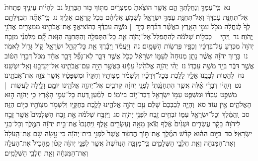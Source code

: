 \documentclass[18pt]{article}
\begin{document}
 {\loc נא~}כִּֽי־עַמְּךָ֥ וְנַחֲלָתְךָ֖ הֵ֑ם אֲשֶׁ֤ר הוֹצֵ֙אתָ֙ מִמִּצְרַ֔יִם מִתּ֖וֹךְ כּ֥וּר הַבַּרְזֶֽל׃ \startlock
 {\loc נב~}לִהְי֨וֹת עֵינֶ֤יךָ פְתֻחֹת֙ אֶל־תְּחִנַּ֣ת עַבְדְּךָ֔ וְאֶל־תְּחִנַּ֖ת עַמְּךָ֣ יִשְׂרָאֵ֑ל לִשְׁמֹ֣עַ אֲלֵיהֶ֔ם בְּכֹ֖ל קׇרְאָ֥ם אֵלֶֽיךָ׃ \startlock
 {\loc נג~}כִּֽי־אַתָּ֞ה הִבְדַּלְתָּ֤ם לְךָ֙ לְֽנַחֲלָ֔ה מִכֹּ֖ל עַמֵּ֣י הָאָ֑רֶץ כַּאֲשֶׁ֨ר דִּבַּ֜רְתָּ בְּיַ֣ד  |  מֹשֶׁ֣ה עַבְדֶּ֗ךָ בְּהוֹצִיאֲךָ֧ אֶת־אֲבֹתֵ֛ינוּ מִמִּצְרַ֖יִם אֲדֹנָ֥י יֱהֹוִֽה׃ \startlock
 {\loc נד~}וַיְהִ֣י  |  כְּכַלּ֣וֹת שְׁלֹמֹ֗ה לְהִתְפַּלֵּל֙ אֶל־יְהֹוָ֔ה אֵ֛ת כׇּל־הַתְּפִלָּ֥ה וְהַתְּחִנָּ֖ה הַזֹּ֑את קָ֞ם מִלִּפְנֵ֨י מִזְבַּ֤ח יְהֹוָה֙ מִכְּרֹ֣עַ עַל־בִּרְכָּ֔יו וְכַפָּ֖יו פְּרֻשׂ֥וֹת הַשָּׁמָֽיִם׃ \startlock
 {\loc נה~}וַיַּעֲמֹ֕ד וַיְבָ֕רֶךְ אֵ֖ת כׇּל־קְהַ֣ל יִשְׂרָאֵ֑ל ק֥וֹל גָּד֖וֹל לֵאמֹֽר׃ \startlock
 {\loc נו~}בָּר֣וּךְ יְהֹוָ֗ה אֲשֶׁ֨ר נָתַ֤ן מְנוּחָה֙ לְעַמּ֣וֹ יִשְׂרָאֵ֔ל כְּכֹ֖ל אֲשֶׁ֣ר דִּבֵּ֑ר לֹֽא־נָפַ֞ל דָּבָ֣ר אֶחָ֗ד מִכֹּל֙ דְּבָר֣וֹ הַטּ֔וֹב אֲשֶׁ֣ר דִּבֶּ֔ר בְּיַ֖ד מֹשֶׁ֥ה עַבְדּֽוֹ׃ \startlock
 {\loc נז~}יְהִ֨י יְהֹוָ֤ה אֱלֹהֵ֙ינוּ֙ עִמָּ֔נוּ כַּאֲשֶׁ֥ר הָיָ֖ה עִם־אֲבֹתֵ֑ינוּ אַל־יַעַזְבֵ֖נוּ וְאַֽל־יִטְּשֵֽׁנוּ׃ \startlock
 {\loc נח~}לְהַטּ֥וֹת לְבָבֵ֖נוּ אֵלָ֑יו לָלֶ֣כֶת בְּכׇל־דְּרָכָ֗יו וְלִשְׁמֹ֨ר מִצְוֺתָ֤יו וְחֻקָּיו֙ וּמִשְׁפָּטָ֔יו אֲשֶׁ֥ר צִוָּ֖ה אֶת־אֲבֹתֵֽינוּ׃ \startlock
 {\loc נט~}וְיִֽהְי֨וּ דְבָרַ֜י אֵ֗לֶּה אֲשֶׁ֤ר הִתְחַנַּ֙נְתִּי֙ לִפְנֵ֣י יְהֹוָ֔ה קְרֹבִ֛ים אֶל־יְהֹוָ֥ה אֱלֹהֵ֖ינוּ יוֹמָ֣ם וָלָ֑יְלָה לַעֲשׂ֣וֹת  |  מִשְׁפַּ֣ט עַבְדּ֗וֹ וּמִשְׁפַּ֛ט עַמּ֥וֹ יִשְׂרָאֵ֖ל דְּבַר־י֥וֹם בְּיוֹמֽוֹ׃ \startlock
 {\loc ס~}לְמַ֗עַן דַּ֚עַת כׇּל־עַמֵּ֣י הָאָ֔רֶץ כִּ֥י יְהֹוָ֖ה ה֣וּא הָאֱלֹהִ֑ים אֵ֖ין עֽוֹד׃ \startlock
 {\loc סא~}וְהָיָ֤ה לְבַבְכֶם֙ שָׁלֵ֔ם עִ֖ם יְהֹוָ֣ה אֱלֹהֵ֑ינוּ לָלֶ֧כֶת בְּחֻקָּ֛יו וְלִשְׁמֹ֥ר מִצְוֺתָ֖יו כַּיּ֥וֹם הַזֶּֽה׃ \startlock
 {\loc סב~}וְֽהַמֶּ֔לֶךְ וְכׇל־יִשְׂרָאֵ֖ל עִמּ֑וֹ זֹבְחִ֥ים זֶ֖בַח לִפְנֵ֥י יְהֹוָֽה׃ \startlock
 {\loc סג~}וַיִּזְבַּ֣ח שְׁלֹמֹ֗ה אֵ֣ת זֶ֣בַח הַשְּׁלָמִים֮ אֲשֶׁ֣ר זָבַ֣ח לַיהֹוָה֒ בָּקָ֗ר עֶשְׂרִ֤ים וּשְׁנַ֙יִם֙ אֶ֔לֶף וְצֹ֕אן מֵאָ֥ה וְעֶשְׂרִ֖ים אָ֑לֶף וַֽיַּחְנְכוּ֙ אֶת־בֵּ֣ית יְהֹוָ֔ה הַמֶּ֖לֶךְ וְכׇל־בְּנֵ֥י יִשְׂרָאֵֽל׃ \startlock
 {\loc סד~}בַּיּ֣וֹם הַה֗וּא קִדַּ֨שׁ הַמֶּ֜לֶךְ אֶת־תּ֣וֹךְ הֶחָצֵ֗ר אֲשֶׁר֙ לִפְנֵ֣י בֵית־יְהֹוָ֔ה כִּי־עָ֣שָׂה שָׁ֗ם אֶת־הָֽעֹלָה֙ וְאֶת־הַמִּנְחָ֔ה וְאֵ֖ת חֶלְבֵ֣י הַשְּׁלָמִ֑ים כִּֽי־מִזְבַּ֤ח הַנְּחֹ֙שֶׁת֙ אֲשֶׁ֣ר לִפְנֵ֣י יְהֹוָ֔ה קָטֹ֗ן מֵֽהָכִיל֙ אֶת־הָעֹלָ֣ה וְאֶת־הַמִּנְחָ֔ה וְאֵ֖ת חֶלְבֵ֥י הַשְּׁלָמִֽים׃ \startlock
\end{document}

